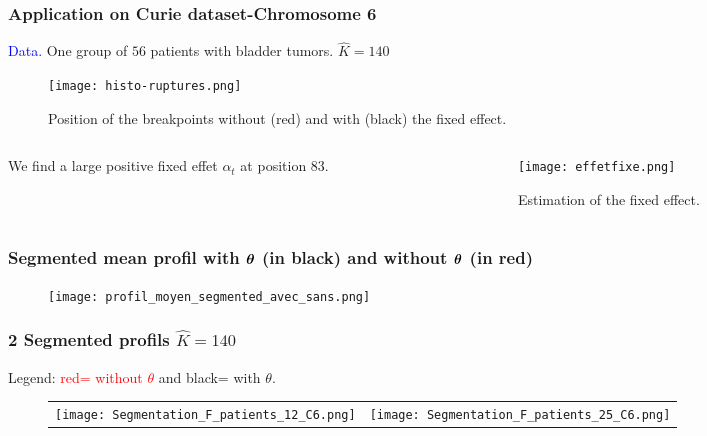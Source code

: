 \documentclass[compress]{beamer}
\newcommand{\thetabf}{\text{\mathversion{bold}{$\theta$}}}
\begin{document}
\begin{frame}
\frametitle{Application on Curie dataset-Chromosome 6}
\textcolor{blue}{Data.} One group of $56$ patients with bladder tumors.
$\hat K=140$

 \begin{figure}
  \texttt{[image: histo-ruptures.png]}
 \caption{Position of the breakpoints without (red) and with (black) the fixed effect.}
  \end{figure}

\end{frame}
\begin{frame}
\begin{columns}
\begin{column}{3cm}
We find a large positive fixed effet $\alpha_t$ at position $83$. 
\end{column}
\begin{column}{8cm}
\begin{figure}
  \texttt{[image: effetfixe.png]}
 \caption{Estimation of the fixed effect.}
  \end{figure}
\end{column}
\end{columns}
\end{frame}

\begin{frame}
\frametitle{Segmented mean profil with $\thetabf$ (in black) and without $\thetabf$ (in red)}
\begin{figure}
\begin{center}
\texttt{[image: profil\_moyen\_segmented\_avec\_sans.png]}
\end{center}
\end{figure}
\end{frame}

\begin{frame}
\frametitle{2 Segmented profils $\hat K=140$ }
Legend: \textcolor{red}{red= without $\theta$} and black= with $\theta$.
\begin{figure}
\begin{tabular}{cc}
\texttt{[image: Segmentation\_F\_patients\_12\_C6.png]}&
\texttt{[image: Segmentation\_F\_patients\_25\_C6.png]}
\end{tabular}
\end{figure}
\end{frame}
\end{document}
